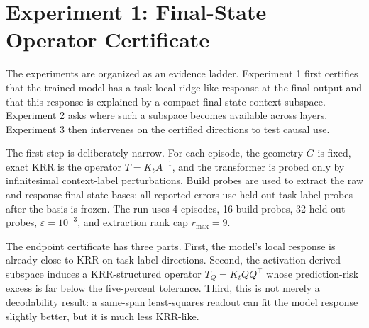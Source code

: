 \documentclass[11pt]{article}
\begin{document}
\section{Experiment 1: Final-State Operator Certificate}

The experiments are organized as an evidence ladder. Experiment 1 first certifies that the
trained model has a task-local ridge-like response at the final output and that this response is
explained by a compact final-state context subspace. Experiment 2 asks where such a subspace becomes
available across layers. Experiment 3 then intervenes on the certified directions to test causal
use.

The first step is deliberately narrow. For each episode, the geometry \(G\) is fixed, exact KRR is
the operator \(T=K_tA^{-1}\), and the transformer is probed only by infinitesimal context-label
perturbations. Build probes are used to extract the raw and response final-state bases; all reported
errors use held-out task-label probes after the basis is frozen. The run uses 4 episodes, 16 build
probes, 32 held-out probes, \(\varepsilon=10^{-3}\), and extraction rank cap \(r_{\max}=9\).

The endpoint certificate has three parts. First, the model's local response is already close to
KRR on task-label directions. Second, the activation-derived subspace induces a KRR-structured
operator \(T_Q=K_tQQ^\top\) whose prediction-risk excess is far below the five-percent tolerance.
Third, this is not merely a decodability result: a same-span least-squares readout can fit the
model response slightly better, but it is much less KRR-like.
\end{document}
